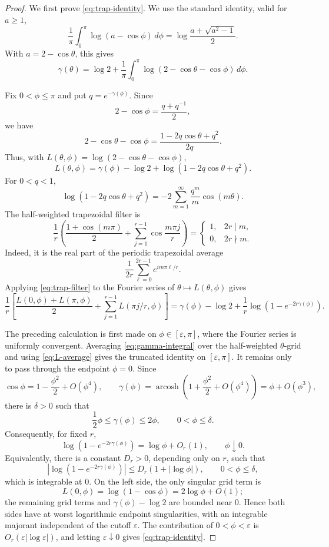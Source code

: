 \documentclass[11pt]{article}
\numberwithin{equation}{section}
\DeclareMathOperator{\arcosh}{arcosh}
\newcommand{\dd}{\,d}
\begin{document}
\begin{proof}
We first prove \eqref{eq:trap-identity}. We use the standard identity, valid for $a\ge1$,
\[
  \frac1\pi\int_0^\pi\log(a-\cos\phi)\dd\phi
  =
  \log\frac{a+\sqrt{a^2-1}}{2}.
\]
With $a=2-\cos\theta$, this gives
\begin{equation}\label{eq:gamma-integral}
  \gamma(\theta)
  =
  \log2+
  \frac1\pi\int_0^\pi
  \log(2-\cos\theta-\cos\phi)\dd\phi.
\end{equation}

Fix $0<\phi\le\pi$ and put $q=e^{-\gamma(\phi)}$. Since
\[
  2-\cos\phi=\frac{q+q^{-1}}2,
\]
we have
\[
  2-\cos\theta-\cos\phi
  =
  \frac{1-2q\cos\theta+q^2}{2q}.
\]
Thus, with $L(\theta,\phi)=\log(2-\cos\theta-\cos\phi)$,
\[
  L(\theta,\phi)
  =
  \gamma(\phi)-\log2+
  \log(1-2q\cos\theta+q^2).
\]
For $0<q<1$,
\[
  \log(1-2q\cos\theta+q^2)
  =
  -2\sum_{m=1}^\infty\frac{q^m}{m}\cos(m\theta).
\]
The half-weighted trapezoidal filter is
\begin{equation}\label{eq:trap-filter}
  \frac1r\left(
  \frac{1+\cos(m\pi)}2+
  \sum_{j=1}^{r-1}\cos\frac{m\pi j}{r}
  \right)
  =
  \begin{cases}
  1,&2r\mid m,\\
  0,&2r\nmid m.
  \end{cases}
\end{equation}
Indeed, it is the real part of the periodic trapezoidal average
\[
  \frac1{2r}\sum_{\ell=0}^{2r-1}e^{i m\pi\ell/r}.
\]
Applying \eqref{eq:trap-filter} to the Fourier series of $\theta\mapsto L(\theta,\phi)$ gives
\begin{equation}\label{eq:L-average}
  \frac1r\left[
  \frac{L(0,\phi)+L(\pi,\phi)}2+
  \sum_{j=1}^{r-1}L(\pi j/r,\phi)
  \right]
  =
  \gamma(\phi)-\log2+
  \frac1r\log\left(1-e^{-2r\gamma(\phi)}\right).
\end{equation}

The preceding calculation is first made on $\phi\in[\varepsilon,\pi]$, where the Fourier series is uniformly convergent. Averaging \eqref{eq:gamma-integral} over the half-weighted $\theta$-grid and using \eqref{eq:L-average} gives the truncated identity on $[\varepsilon,\pi]$. It remains only to pass through the endpoint $\phi=0$. Since
\[
  \cos\phi=1-\frac{\phi^2}{2}+O(\phi^4),
  \qquad
  \gamma(\phi)=\arcosh\left(1+\frac{\phi^2}{2}+O(\phi^4)\right)
  =\phi+O(\phi^3),
\]
there is $\delta>0$ such that
\[
  \frac12\phi\le \gamma(\phi)\le 2\phi,
  \qquad 0<\phi\le\delta.
\]
Consequently, for fixed $r$,
\[
  \log\left(1-e^{-2r\gamma(\phi)}\right)
  =
  \log\phi+O_r(1),
  \qquad \phi\downarrow0.
\]
Equivalently, there is a constant $D_r>0$, depending only on $r$, such that
\[
  \left|\log\left(1-e^{-2r\gamma(\phi)}\right)\right|
  \le D_r(1+|\log\phi|),
  \qquad 0<\phi\le\delta,
\]
which is integrable at $0$.
On the left side, the only singular grid term is
\[
  L(0,\phi)=\log(1-\cos\phi)=2\log\phi+O(1);
\]
the remaining grid terms and $\gamma(\phi)-\log2$ are bounded near $0$. Hence both sides have at worst logarithmic endpoint singularities, with an integrable majorant independent of the cutoff $\varepsilon$. The contribution of $0<\phi<\varepsilon$ is $O_r(\varepsilon|\log\varepsilon|)$, and letting $\varepsilon\downarrow0$ gives \eqref{eq:trap-identity}.


\end{proof}
\end{document}
